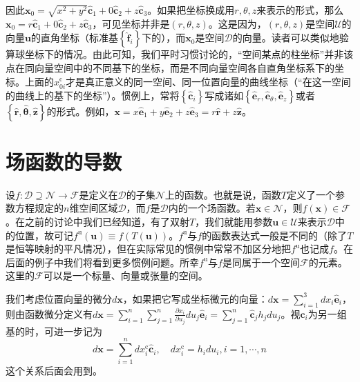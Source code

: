 \documentclass[../main.tex]{subfiles}
\begin{document}
\begin{example}[柱坐标]
    因此$\mathbf{x}_0=\sqrt{x^2+y^2}\mathbf{\hat{c}}_1+0\mathbf{\hat{c}}_2+z\mathbf{\hat{c}}_3$。如果把坐标换成用$r,\theta,z$来表示的形式，那么$\mathbf{x}_0=r\mathbf{\hat{c}}_1+0\mathbf{\hat{c}}_2+z\mathbf{\hat{c}}_3$，可见坐标并非是$\left(r,\theta,z\right)$。这是因为，$\left(r,\theta,z\right)$是空间$\mathcal{U}$的向量$\mathbf{u}$的直角坐标（标准基$\left\{\mathbf{\hat{f}}_i\right\}$下的），而$\mathbf{x}_0$是空间$\mathcal{D}$的向量。读者可以类似地验算球坐标下的情况。由此可知，我们平时习惯讨论的，“空间某点的柱坐标”并非该点在同向量空间中的不同基下的坐标，而是不同向量空间各自直角坐标系下的坐标。上面的$x_{0i}^\mathrm{c}$才是真正意义的同一空间、同一位置向量的曲线坐标（“在这一空间的曲线上的基下的坐标”）。惯例上，常将$\left\{\mathbf{\hat{c}}_i\right\}$写成诸如$\left\{\mathbf{\hat{e}}_r,\mathbf{\hat{e}}_\theta,\mathbf{\hat{e}}_z\right\}$或者$\left\{\mathbf{\hat{r}},\hat{\boldsymbol{\theta}},\mathbf{\hat{z}}\right\}$的形式。例如，$\mathbf{x}=x\mathbf{\hat{e}}_1+y\mathbf{\hat{e}}_2+z\mathbf{\hat{e}}_3=r\mathbf{\hat{r}}+z\mathbf{\hat{z}}$。
\end{example}

\section{场函数的导数}
设$f:\mathcal{D}\supseteq\mathcal{N}\rightarrow\mathcal{F}$是定义在$\mathcal{D}$的子集$\mathcal{N}$上的函数。也就是说，函数$T$定义了一个参数方程规定的$n$维空间区域$\mathcal{D}$，而$f$是$\mathcal{D}$内的一个场函数。若$\mathbf{x}\in\mathcal{N}$，则$f\left(\mathbf{x}\right)\in\mathcal{F}$。在之前的讨论中我们已经知道，有了双射$T$，我们就能用参数$\mathbf{u}\in\mathcal{U}$来表示$\mathcal{D}$中的位置，故可记$f^\mathrm{u}\left(\mathbf{u}\right)\equiv f\left(T\left(\mathbf{u}\right)\right)$。$f^\mathrm{u}$与$f$的函数表达式一般是不同的（除了$T$是恒等映射的平凡情况），但在实际常见的惯例中常常不加区分地把$f^\mathrm{u}$也记成$f$。在后面的例子中我们将看到更多惯例问题。所幸$f^\mathrm{u}$与$f$是同属于一个空间$\mathcal{F}$的元素。这里的$\mathcal{F}$可以是一个标量、向量或张量的空间。

我们考虑位置向量的微分$d\mathbf{x}$，如果把它写成坐标微元的向量：$d\mathbf{x}=\sum_{i=1}^3dx_i\mathbf{\hat{e}}_i$，则由函数微分定义有$d\mathbf{x}=\sum_{i=1}^n\sum_{j=1}^n\frac{\partial x_i}{\partial u_j}du_j\mathbf{\hat{e}}_i=\sum_{j=1}^n\mathbf{\hat{c}}_jh_jdu_j$。视$\mathbf{\hat{c}}_i$为另一组基的时，可进一步记为
\[d\mathbf{x}=\sum_{i=1}^ndx_i^\mathrm{c}\mathbf{\hat{c}}_i,\quad dx_i^\mathrm{c}=h_idu_i,i=1,\cdots,n\]
这个关系后面会用到。
\end{document}
